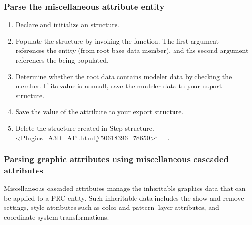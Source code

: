 \documentclass[letterpaper,12pt,english,openany,oneside]{sphinxmanual}
\begin{document}
\subsubsection{Parse the miscellaneous attribute entity}
\label{\detokenize{Plugins_A3D_API:parse-the-miscellaneous-attribute-entity}}\begin{enumerate}
%
\item {} 
Declare and initialize an  structure.

\item {} 
Populate the  structure by invoking the  function. The first argument references the  entity (from root base data  member), and the second argument references the  being populated.

\item {} 
Determine whether the root data contains modeler data by checking the  member. If its value is non\sphinxhyphen{}null, save the modeler data to your export structure.

\item {} 
Save the value of the  attribute to your export structure.

\item {} 
Delete the  structure created in Step  structure. <Plugins\_A3D\_API.html\#50618396\_78650>`\_\_.

\end{enumerate}


\subsubsection{Parsing graphic attributes using miscellaneous cascaded attributes}
\label{\detokenize{Plugins_A3D_API:parsing-graphic-attributes-using-miscellaneous-cascaded-attributes}}
Miscellaneous cascaded attributes manage the inheritable graphics data that can be applied to a PRC entity. Such inheritable data includes the show and remove settings, style attributes such as color and pattern, layer attributes, and coordinate system transformations.
\end{document}
